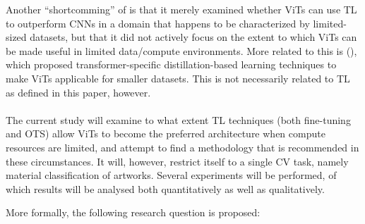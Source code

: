 Another ``shortcomming'' of \citeauthor{matsoukas2021time} is that it merely examined whether ViTs can use TL to outperform CNNs in a domain that happens to be characterized by limited-sized datasets, but that it did not actively focus on the extent to which ViTs can be made useful in limited data/compute environments. More related to this is \citeauthor{touvron2021training} (\citeyear{touvron2021training}), which proposed transformer-specific distillation-based learning techniques to make ViTs applicable for smaller datasets. This is not necessarily related to TL as defined in this paper, however.
\\\\
The current study will examine to what extent TL techniques (both fine-tuning and OTS) allow ViTs to become the preferred architecture when compute resources are limited, and attempt to find a methodology that is recommended in these circumstances. It will, however, restrict itself to a single CV task, namely material classification of artworks. Several experiments will be performed, of which results will be analysed both quantitatively as well as qualitatively.


More formally, the following research question is proposed: 
